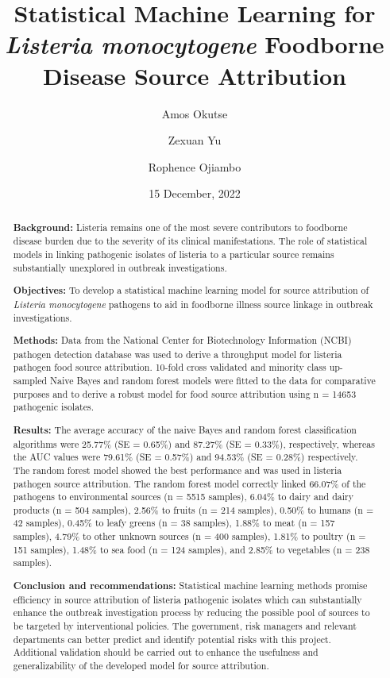 \documentclass[
  10pt,
]{article}
\title{Statistical Machine Learning for \emph{Listeria monocytogene} Foodborne Disease Source Attribution}
\author{Amos Okutse \and Zexuan Yu \and Rophence Ojiambo}
\date{15 December, 2022}
\begin{document}
\maketitle
\begin{abstract}
\textbf{Background:} Listeria remains one of the most severe contributors to foodborne disease burden due to the severity of its clinical manifestations. The role of statistical models in linking pathogenic isolates of listeria to a particular source remains substantially unexplored in outbreak investigations.

\textbf{Objectives:} To develop a statistical machine learning model for source attribution of \emph{Listeria monocytogene} pathogens to aid in foodborne illness source linkage in outbreak investigations.

\textbf{Methods:} Data from the National Center for Biotechnology Information (NCBI) pathogen detection database was used to derive a throughput model for listeria pathogen food source attribution. 10-fold cross validated and minority class up-sampled Naive Bayes and random forest models were fitted to the data for comparative purposes and to derive a robust model for food source attribution using n = 14653 pathogenic isolates.

\textbf{Results:} The average accuracy of the naive Bayes and random forest classification algorithms were 25.77\% (SE = 0.65\%) and 87.27\% (SE = 0.33\%), respectively, whereas the AUC values were 79.61\% (SE = 0.57\%) and 94.53\% (SE = 0.28\%) respectively. The random forest model showed the best performance and was used in listeria pathogen source attribution. The random forest model correctly linked 66.07\% of the pathogens to environmental sources (n = 5515 samples), 6.04\% to dairy and dairy products (n = 504 samples), 2.56\% to fruits (n = 214 samples), 0.50\% to humans (n = 42 samples), 0.45\% to leafy greens (n = 38 samples), 1.88\% to meat (n = 157 samples), 4.79\% to other unknown sources (n = 400 samples), 1.81\% to poultry (n = 151 samples), 1.48\% to sea food (n = 124 samples), and 2.85\% to vegetables (n = 238 samples).

\textbf{Conclusion and recommendations:} Statistical machine learning methods promise efficiency in source attribution of listeria pathogenic isolates which can substantially enhance the outbreak investigation process by reducing the possible pool of sources to be targeted by interventional policies. The government, risk managers and relevant departments can better predict and identify potential risks with this project. Additional validation should be carried out to enhance the usefulness and generalizability of the developed model for source attribution.
\end{abstract}
\end{document}
